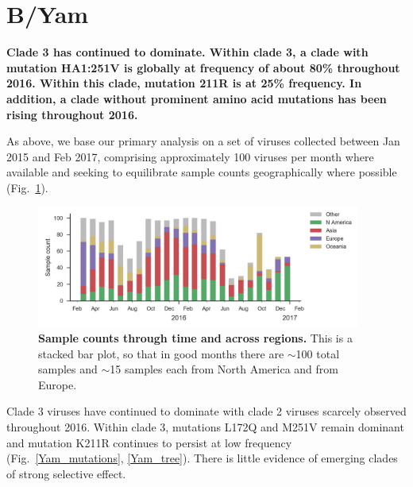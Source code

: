 \documentclass[11pt,oneside,letterpaper]{article}
\begin{document}
\clearpage
\pagebreak

\section*{B/Yam}

\textbf{Clade 3 has continued to dominate. Within clade 3, a clade with mutation HA1:251V is globally at frequency of about 80\% throughout 2016. Within this clade, mutation 211R is at 25\% frequency. In addition, a clade without prominent amino acid mutations has been rising throughout 2016.}

As above, we base our primary analysis on a set of viruses collected between Jan 2015 and Feb 2017, comprising approximately 100 viruses per month where available and seeking to equilibrate sample counts geographically where possible (Fig.\ \ref{Yam_counts}).

\begin{figure}[H]
	\centering
	\includegraphics[width=0.95\textwidth]{../figures/feb-2017/Yam_counts.png}
	\caption{\textbf{Sample counts through time and across regions.}
	This is a stacked bar plot, so that in good months there are $\sim$100 total samples and $\sim$15 samples each from North America and from Europe.
	}
	\label{Yam_counts}
\end{figure}

\pagebreak

Clade 3 viruses have continued to dominate with clade 2 viruses scarcely observed throughout 2016.
Within clade 3, mutations L172Q and M251V remain dominant and mutation K211R continues to persist at low frequency (Fig.\ \ref{Yam_mutations}, \ref{Yam_tree}). There is little evidence of emerging clades of strong selective effect.
\end{document}
